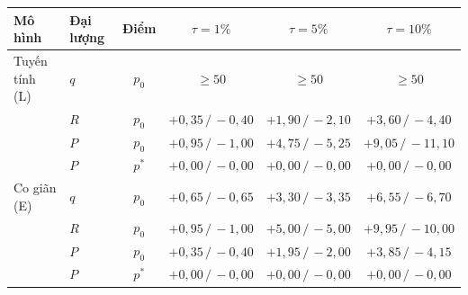 
\begin{tabular}{@{}llcccc@{}}
\toprule
Mô hình & Đại lượng & Điểm & $\tau=1\%$ & $\tau=5\%$ & $\tau=10\%$ \\
\midrule
Tuyến tính (L) & $q$ & $p_0$ & $\geq 50$ & $\geq 50$ & $\geq 50$ \\
 & $R$ & $p_0$ & ${+}0{,}35\,/\,{-}0{,}40$ & ${+}1{,}90\,/\,{-}2{,}10$ & ${+}3{,}60\,/\,{-}4{,}40$ \\
 & $P$ & $p_0$ & ${+}0{,}95\,/\,{-}1{,}00$ & ${+}4{,}75\,/\,{-}5{,}25$ & ${+}9{,}05\,/\,{-}11{,}10$ \\
 & $P$ & $p^*$ & ${+}0{,}00\,/\,{-}0{,}00$ & ${+}0{,}00\,/\,{-}0{,}00$ & ${+}0{,}00\,/\,{-}0{,}00$ \\
\midrule
Co giãn (E) & $q$ & $p_0$ & ${+}0{,}65\,/\,{-}0{,}65$ & ${+}3{,}30\,/\,{-}3{,}35$ & ${+}6{,}55\,/\,{-}6{,}70$ \\
 & $R$ & $p_0$ & ${+}0{,}95\,/\,{-}1{,}00$ & ${+}5{,}00\,/\,{-}5{,}00$ & ${+}9{,}95\,/\,{-}10{,}00$ \\
 & $P$ & $p_0$ & ${+}0{,}35\,/\,{-}0{,}40$ & ${+}1{,}95\,/\,{-}2{,}00$ & ${+}3{,}85\,/\,{-}4{,}15$ \\
 & $P$ & $p^*$ & ${+}0{,}00\,/\,{-}0{,}00$ & ${+}0{,}00\,/\,{-}0{,}00$ & ${+}0{,}00\,/\,{-}0{,}00$ \\
\bottomrule
\end{tabular}
